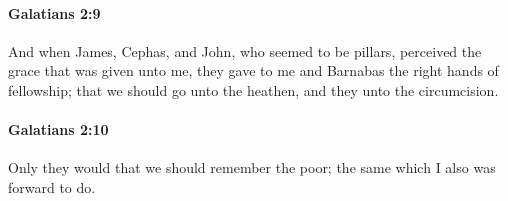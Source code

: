 		\paragraph{Galatians 2:9} %
			\label{GALATIANS-2-9}

			And when James, Cephas, and John, who seemed to be pillars, perceived the grace that was given unto me, they gave to me and Barnabas the right hands of fellowship; that we should go unto the heathen, and they unto the circumcision.

			\begin{framed}
			\scriptsize
				\begin{compactdesc}
					\item[SBLG] 
				\end{compactdesc}
			\end{framed}

		\paragraph{Galatians 2:10} %
			\label{GALATIANS-2-10}

			Only they would that we should remember the poor; the same which I also was forward to do.

